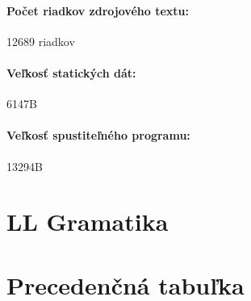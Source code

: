 \documentclass[12pt,a4paper,titlepage,final]{article}
\begin{document}
\paragraph{Počet riadkov zdrojového textu:} 12689 riadkov
\paragraph{Veľkosť statických dát:} 6147B
\paragraph{Veľkosť spustiteľného programu:} 13294B

%
\section{LL Gramatika} \label{gramatika}

%
\section{Precedenčná tabuľka} \label{precedencna_tabulka}
\end{document}
